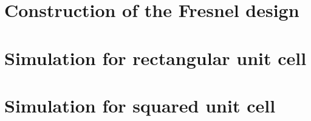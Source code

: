 \section{Construction of the Fresnel design}

\section{Simulation for rectangular unit cell}

\section{Simulation for squared unit cell}